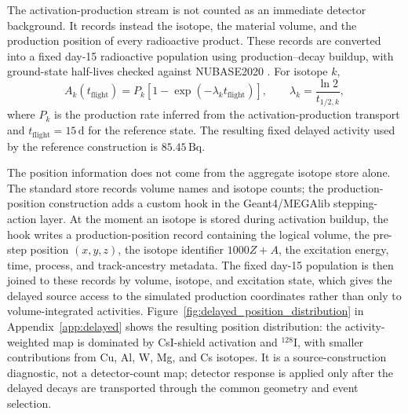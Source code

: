 \documentclass[pdflatex,sn-mathphys-num]{sn-jnl}
\begin{document}
The activation-production stream is not counted as an immediate detector
background. It records instead the isotope, the material volume, and the
production position of every radioactive product. These records are converted
into a fixed day-15 radioactive population using production--decay buildup,
with ground-state half-lives checked against NUBASE2020
\cite{Kondev2021NUBASE}. For isotope $k$,
\begin{equation}
  A_k(t_{\mathrm{flight}}) = P_k\left[1-\exp\left(-\lambda_k t_{\mathrm{flight}}\right)\right],
  \qquad \lambda_k = \frac{\ln 2}{t_{1/2,k}},
\end{equation}
where $P_k$ is the production rate inferred from the activation-production
transport and $t_{\mathrm{flight}}=15\,\mathrm{d}$ for the reference state.
The resulting fixed delayed activity used by the reference construction is
$85.45\,\mathrm{Bq}$.

The position information does not come from the aggregate isotope store alone.
The standard store records volume names and isotope counts; the
production-position construction adds a custom hook in the Geant4/MEGAlib
stepping-action layer. At the moment an isotope is stored during activation
buildup, the hook writes a production-position record containing the logical
volume, the pre-step position $(x,y,z)$, the isotope identifier $1000Z+A$, the
excitation energy, time, process, and track-ancestry metadata. The fixed
day-15 population is then joined to these records by volume, isotope, and
excitation state, which gives the delayed source access to the simulated
production coordinates rather than only to volume-integrated activities.
Figure~\ref{fig:delayed_position_distribution} in Appendix~\ref{app:delayed}
shows the resulting position distribution: the activity-weighted map is
dominated by CsI-shield activation and $^{128}$I, with smaller contributions
from Cu, Al, W, Mg, and Cs isotopes. It is a source-construction diagnostic,
not a detector-count map; detector response is applied only after the delayed
decays are transported through the common geometry and event selection.
\end{document}
